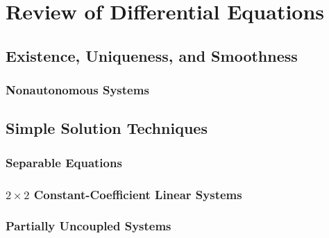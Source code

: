 \chapter{Review of Differential Equations}

\section{Existence, Uniqueness, and Smoothness}

\subsection{Nonautonomous Systems}

\section{Simple Solution Techniques}

\subsection{Separable Equations}

\subsection{\( 2\times 2 \) Constant-Coefficient Linear Systems}

\subsection{Partially Uncoupled Systems}
